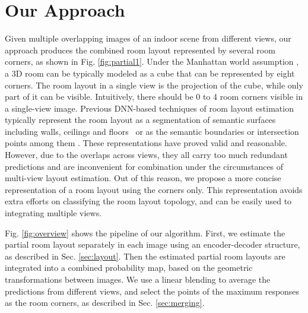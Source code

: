 \section{Our Approach}

%
Given multiple overlapping images of an indoor scene from different views, our approach produces the combined room layout represented by several room corners, as shown in Fig. \ref{fig:partial1}. 
Under the Manhattan world assumption \cite{coughlan1999manhattan}, a 3D room can be typically modeled as a cube that can be represented by eight corners.
The room layout in a single view is the projection of the cube, while only part of it can be visible. 
Intuitively, there should be 0 to 4 room corners visible in a single-view image. 
%
Previous DNN-based techniques of room layout estimation typically represent the room layout as a segmentation of semantic surfaces including walls, ceilings and floors~\cite{dasgupta2016delay, ours} or as the semantic boundaries or intersection points among them \cite{ren2016coarse}. 
%
These representations have proved valid and reasonable. 
However, due to the overlaps across views, they all carry too much redundant predictions and are inconvenient for combination under the circumstances of multi-view layout estimation. 
Out of this reason, we propose a more concise representation of a room layout using the corners only.
This representation avoids extra efforts on classifying the room layout topology, and can be easily used to integrating multiple views.

%
%
Fig. \ref{fig:overview} shows the pipeline of our algorithm. 
First, we estimate the partial room layout separately in each image using an encoder-decoder structure, as described in Sec. \ref{sec:layout}. 
Then the estimated partial room layouts are integrated into a combined probability map, based on the geometric transformations between images. 
We use a linear blending to average the predictions from different views, and select the points of the maximum responses as the room corners, as described in Sec. \ref{sec:merging}. 

